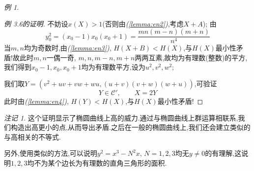 \documentclass[12pt,A4paper,oneside,reqno]{amsart}
\numberwithin{equation}{section}
\theoremstyle{definition}
\theoremstyle{plain}
\theoremstyle{plain}
\numberwithin{equation}{section}
\theoremstyle{remark}
\newtheorem{remark}[theorem]{注记}
\newtheorem{eg}[theorem]{例}
\begin{document}
\begin{eg}
\begin{proof}[例 3.6的证明]
		不妨设$x(X)>1$(否则由\textit{(\ref{lemma:en2})},考虑$X+A$);
		由
		$$y_0^2=(x_0-1)x_0(x_0+1)=\frac{mn(m-n)(m+n)}{n^4}$$
		当$m,n$均为奇数时,由\textit{(\ref{lemma:en3})}, $H(X+B)<H(X)$,与$H(X)$最小性矛盾!故此时$m,n$一偶一奇, $m,n,m-n,m+n$两两互素,故均为有理数(整数)的平方,我们得到$x_0-1,x_0,x_0+1$均为有理数平方,设为$u^2,v^2,w^2$;
		
		我们取$Y=(v^2+uv+vw+wu,(u+v)(v+w)(w+u))$,可验证
		$$Y \in \mathcal{C}', \qquad X=2Y$$
		此时由\textit{(\ref{lemma:en4})}, $H(Y)<H(X)$,与$H(X)$最小性矛盾!
	\end{proof}
\begin{remark}
	这个证明显示了椭圆曲线上高的威力.通过与椭圆曲线上群运算相联系,我们构造出高更小的点,从而导出矛盾.之后在一般的椭圆曲线上,我们还会建立类似的与高相关的不等式.
	
	另外,使用类似的方法,可以说明$y^2=x^3-N^2x$, $N=1,2,3$均无$y\neq0$的有理解,这说明$1,2,3$均不为某个边长为有理数的直角三角形的面积.
\end{remark}
\end{eg}
\clearpage
\end{document}
